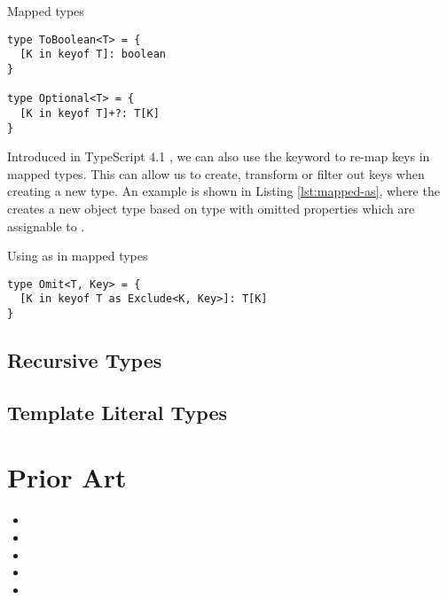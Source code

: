 \begin{listing}[h]
  \caption{Mapped types}\label{lst:mapped-types}
  \begin{verbatim}
type ToBoolean<T> = {
  [K in keyof T]: boolean
}

type Optional<T> = {
  [K in keyof T]+?: T[K]
}
\end{verbatim}
\end{listing}

Introduced in TypeScript 4.1 \cite{rosenwasserAnnouncingTypeScript2020}, we can also use the  keyword to re-map keys in mapped types. This can allow us to create, transform or filter out keys when creating a new type. An example is shown in Listing \ref{lst:mapped-as}, where the  creates a new object type based on type  with omitted properties which are assignable to .

\begin{listing}[h]
  \caption{Using as in mapped types}\label{lst:mapped-as}
  \begin{verbatim}
type Omit<T, Key> = {
  [K in keyof T as Exclude<K, Key>]: T[K]
}
\end{verbatim}
\end{listing}

\subsection{Recursive Types}

\subsection{Template Literal Types}

\section{Prior Art}

\begin{itemize}
  \item {}
  \item {}
  \item {}
  \item {}
  \item {}
\end{itemize}